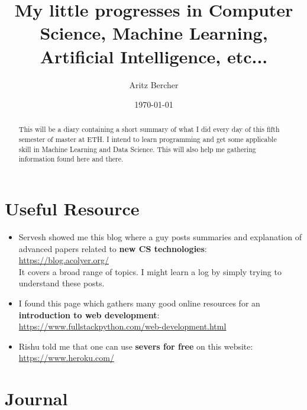 \documentclass[11pt,a4paper]{article}
\title{My little progresses in Computer Science, Machine Learning, Artificial Intelligence, etc...}
\author{Aritz Bercher}
\date{\today}
\begin{document}
\maketitle

\begin{abstract}
This will be a diary containing a short summary of what I did every day of this fifth semester of master at ETH. I intend to learn programming and get some applicable skill in Machine Learning and Data Science. This will also help me gathering information found here and there.
\end{abstract}

\tableofcontents

\section{Useful Resource}

\begin{itemize}
\item Servesh showed me this blog where a guy posts summaries and explanation of advanced papers related to \textbf{new CS technologies}:\\
\url{https://blog.acolyer.org/}\\
It covers a broad range of topics. I might learn a log by simply trying to understand these posts.
\item I found this page which gathers many good online resources for an \textbf{introduction to web development}:\\
\url{https://www.fullstackpython.com/web-development.html}
\item Rishu told me that one can use \textbf{severs for free} on this website:\\
\url{https://www.heroku.com/}
\end{itemize}

\section{Journal}
\end{document}
